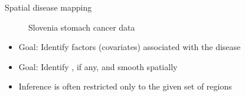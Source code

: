 \begin{frame}{Spatial disease mapping}
	\begin{figure}[t!]
		\centering
		\caption{Slovenia stomach cancer data}
	\end{figure}
	\begin{itemize}
		\item Goal: Identify factors (covariates) associated with the disease
		\item Goal: Identify , if any, and smooth spatially
		\item Inference is often restricted only to the given set of regions 
	\end{itemize}
\end{frame}

